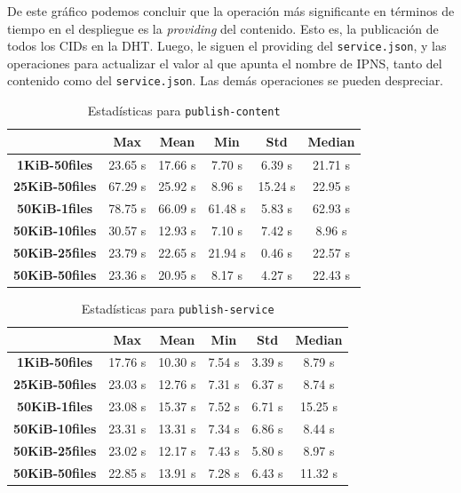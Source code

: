 De este gráfico podemos concluir que la operación más significante en términos de tiempo en el despliegue es la \textit{providing} del contenido. Esto es, la publicación de todos los CIDs en la DHT. Luego, le siguen el providing del \texttt{service.json}, y las operaciones para actualizar el valor al que apunta el nombre de IPNS, tanto del contenido como del \texttt{service.json}. Las demás operaciones se pueden despreciar.



\setlength\tabcolsep{10pt}
\begin{table}[!htbp]
    \centering
    \begin{tabular}{|c|c|c|c|c|c|}
    \hline
    & \textbf{Max} & \textbf{Mean} & \textbf{Min} & \textbf{Std} & \textbf{Median} \\
    \hline
    \textbf{1KiB-50files} & 23.65 s & 17.66 s & 7.70 s & 6.39 s & 21.71 s \\
    \hline
    \textbf{25KiB-50files} & 67.29 s & 25.92 s & 8.96 s & 15.24 s & 22.95 s \\
    \hline
    \textbf{50KiB-1files} & 78.75 s & 66.09 s & 61.48 s & 5.83 s & 62.93 s \\
    \hline
    \textbf{50KiB-10files} & 30.57 s & 12.93 s & 7.10 s & 7.42 s & 8.96 s \\
    \hline
    \textbf{50KiB-25files} & 23.79 s & 22.65 s & 21.94 s & 0.46 s & 22.57 s \\
    \hline
    \textbf{50KiB-50files} & 23.36 s & 20.95 s & 8.17 s & 4.27 s & 22.43 s \\
    \hline
    \end{tabular}
    \caption{Estadísticas para \texttt{publish-content}}
\end{table}

\setlength\tabcolsep{10pt}
\begin{table}[!htbp]
    \centering
    \begin{tabular}{|c|c|c|c|c|c|}
    \hline
    & \textbf{Max} & \textbf{Mean} & \textbf{Min} & \textbf{Std} & \textbf{Median} \\
    \hline
    \textbf{1KiB-50files} & 17.76 s & 10.30 s & 7.54 s & 3.39 s & 8.79 s \\
    \hline
    \textbf{25KiB-50files} & 23.03 s & 12.76 s & 7.31 s & 6.37 s & 8.74 s \\
    \hline
    \textbf{50KiB-1files} & 23.08 s & 15.37 s & 7.52 s & 6.71 s & 15.25 s \\
    \hline
    \textbf{50KiB-10files} & 23.31 s & 13.31 s & 7.34 s & 6.86 s & 8.44 s \\
    \hline
    \textbf{50KiB-25files} & 23.02 s & 12.17 s & 7.43 s & 5.80 s & 8.97 s \\
    \hline
    \textbf{50KiB-50files} & 22.85 s & 13.91 s & 7.28 s & 6.43 s & 11.32 s \\
    \hline
    \end{tabular}
    \caption{Estadísticas para \texttt{publish-service}}
\end{table}

